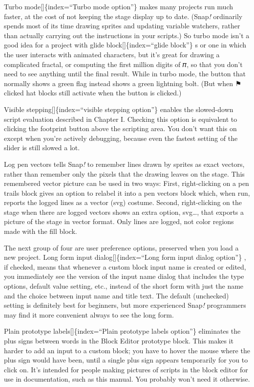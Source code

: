 \documentclass[
  letterpaper,
]{book}
\begin{document}
Turbo mode{[}{]}\{index=``Turbo mode option''\} makes many projects run
much faster, at the cost of not keeping the stage display up to date.
(Snap\emph{!} ordinarily spends most of its time drawing sprites and
updating variable watchers, rather than actually carrying out the
instructions in your scripts.) So turbo mode isn't a good idea for a
project with glide block{[}{]}\{index=``glide block''\} s or one in
which the user interacts with animated characters, but it's great for
drawing a complicated fractal, or computing the first million digits of
𝜋, so that you don't need to see anything until the final result. While
in turbo mode, the button that normally shows a green flag instead shows
a green lightning bolt. (But when ⚑ clicked hat blocks still activate
when the button is clicked.)

Visible stepping{[}{]}\{index=``visible stepping option''\} enables the
slowed-down script evaluation described in Chapter I. Checking this
option is equivalent to clicking the footprint button above the
scripting area. You don't want this on except when you're actively
debugging, because even the fastest setting of the slider is still
slowed a lot.

Log pen vectors\label{logpenvectors}{} tells Snap\emph{!}
to remember lines drawn by sprites as exact vectors, rather than
remember only the pixels that the drawing leaves on the stage. This
remembered vector picture can be used in two ways: First, right-clicking
on a pen trails block gives an option to relabel it into a pen vectors
block which, when run, reports the logged lines as a vector (svg)
costume. Second, right-clicking on the stage when there are logged
vectors shows an extra option, svg\ldots, that exports a picture of the
stage in vector format. Only lines are logged, not color regions made
with the fill block.

The next group of four are user preference options, preserved when you
load a new project. Long form input dialog{[}{]}\{index=``Long form
input dialog option''\} , if checked, means that whenever a custom block
input name is created or edited, you immediately see the version of the
input name dialog that includes the type options, default value setting,
etc., instead of the short form with just the name and the choice
between input name and title text. The default (unchecked) setting is
definitely best for beginners, but more experienced Snap\emph{!}
programmers may find it more convenient always to see the long form.

Plain prototype labels{[}{]}\{index=``Plain prototype labels option''\}
eliminates the plus signs between words in the Block Editor prototype
block. This makes it harder to add an input to a custom block; you have
to hover the mouse where the plus sign would have been, until a single
plus sign appears temporarily for you to click on. It's intended for
people making pictures of scripts in the block editor for use in
documentation, such as this manual. You probably won't need it
otherwise.
\end{document}
